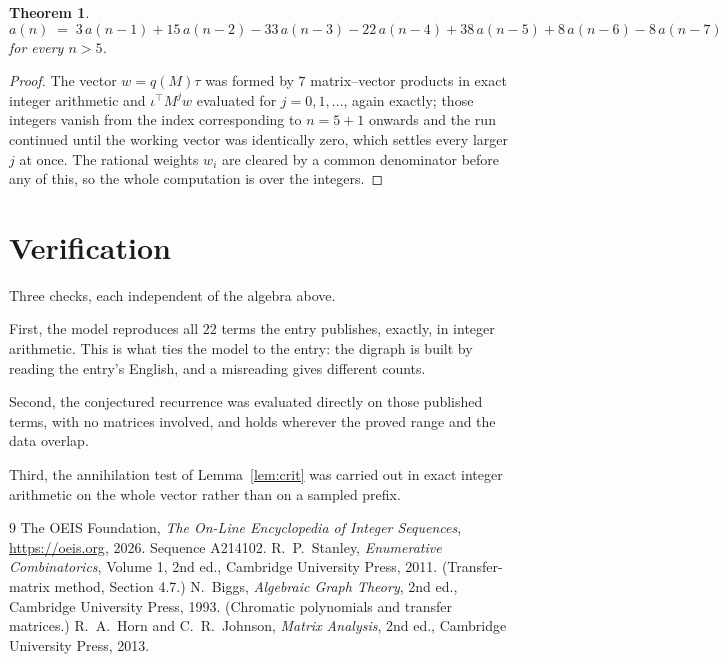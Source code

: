 \documentclass[11pt,a4paper]{article}
\theoremstyle{plain}
\newtheorem{theorem}{Theorem}
\theoremstyle{definition}
\begin{document}
\begin{theorem}
\[
a(n)\;=\;3\,a(n-1) + 15\,a(n-2) - 33\,a(n-3) - 22\,a(n-4) + 38\,a(n-5) + 8\,a(n-6) - 8\,a(n-7)
\]
for every $n>5$.
\end{theorem}

\begin{proof}
The vector $w=q(M)\tau$ was formed by $7$ matrix--vector products in exact integer
arithmetic and $\iota^{\!\top}M^{j}w$ evaluated for $j=0,1,\dots$, again exactly; those
integers vanish from the index corresponding to $n=5+1$ onwards and the run continued
until the working vector was identically zero, which settles every larger $j$ at once. The
rational weights $w_i$ are cleared by a common denominator before any of this, so the whole
computation is over the integers.
\end{proof}

\section{Verification}

Three checks, each independent of the algebra above.

First, the model reproduces all $22$ terms the entry publishes, exactly, in integer
arithmetic. This is what ties the model to the entry: the digraph is built by reading the
entry's English, and a misreading gives different counts.

Second, the conjectured recurrence was evaluated directly on those published terms, with no
matrices involved, and holds wherever the proved range and the data overlap.

Third, the annihilation test of Lemma~\ref{lem:crit} was carried out in exact integer
arithmetic on the whole vector rather than on a sampled prefix.

\begin{thebibliography}{9}
 The OEIS Foundation, \emph{The On-Line Encyclopedia of Integer
Sequences}, \url{https://oeis.org}, 2026. Sequence A214102.
 R.~P.~Stanley, \emph{Enumerative Combinatorics}, Volume 1, 2nd ed.,
Cambridge University Press, 2011. (Transfer-matrix method, Section 4.7.)
 N.~Biggs, \emph{Algebraic Graph Theory}, 2nd ed., Cambridge University
Press, 1993. (Chromatic polynomials and transfer matrices.)
 R.~A.~Horn and C.~R.~Johnson, \emph{Matrix Analysis}, 2nd ed., Cambridge
University Press, 2013.
\end{thebibliography}
\end{document}
